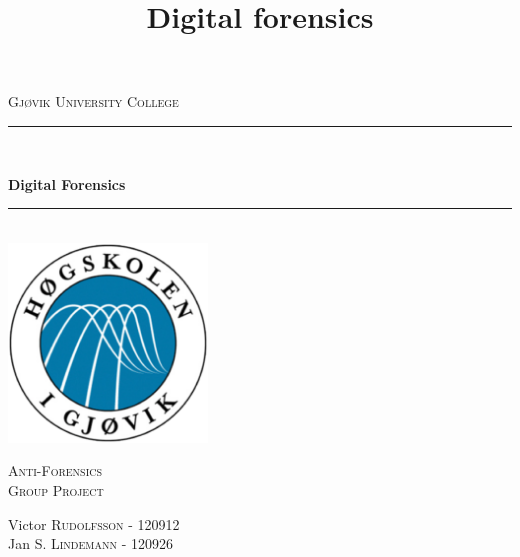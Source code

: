 

\title{Digital forensics}



\begin{titlepage}

\newcommand{\HRule}{\rule{\linewidth}{0.5mm}} %

\center %
\begin{myfont}
\textsc{{\large Gjøvik University College}}\\[0.5cm] %
\end{myfont}
\HRule \\[0.4cm]

\begin{myfont}
{ \huge \bfseries Digital Forensics}\\[0cm] %
\end{myfont}

\HRule \\[0.4cm]
\includegraphics[width=200px, height=200px]{logo}\\[0.8cm] %
\begin{myfont}
\textsc{\Large Anti-Forensics}\\[0.5cm] %
\textsc{\large Group Project}\\[0.5cm] %
\end{myfont}


\begin{minipage}{0.44\textwidth}
\begin{flushleft} \large
\begin{myfont}
Victor \textsc{Rudolfsson} - 120912\\ %
Jan  \textsc{S. Lindemann} - 120926\\ %
\end{myfont}
\end{flushleft}
\end{minipage}
\vspace*{2cm}


\end{titlepage}

